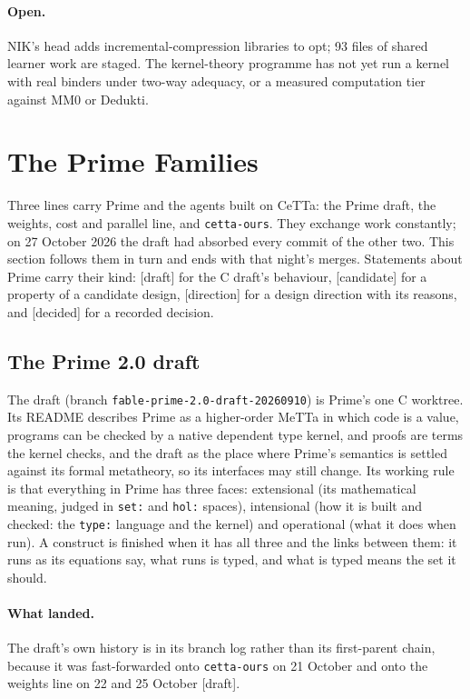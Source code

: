 \documentclass[11pt]{article}
\newcommand{\code}[1]{\texttt{#1}}
\newcommand{\kind}[1]{\textsf{\small[#1]}}
\newcommand{\CeTTa}{\textup{CeTTa}}
\begin{document}
\paragraph{Open.}  NIK's head adds incremental-compression libraries to opt;
93 files of shared learner work are staged.  The kernel-theory programme has
not yet run a kernel with real binders under two-way adequacy, or a measured
computation tier against MM0 or Dedukti.

\section{The Prime Families}
\label{sec:prime-families}

Three lines carry Prime and the agents built on \CeTTa{}: the Prime draft,
the weights, cost and parallel line, and \code{cetta-ours}.  They exchange
work constantly; on 27 October 2026 the draft had absorbed every commit of
the other two.  This section follows them in turn and ends with that night's
merges.  Statements about Prime carry their kind: \kind{draft} for the C
draft's behaviour, \kind{candidate} for a property of a candidate design,
\kind{direction} for a design direction with its reasons, and \kind{decided}
for a recorded decision.

\subsection{The Prime 2.0 draft}
\label{sec:line-draft}

The draft (branch \code{fable-prime-2.0-draft-20260910}) is Prime's one C
worktree.  Its README describes Prime as a higher-order MeTTa in which code is
a value, programs can be checked by a native dependent type kernel, and proofs
are terms the kernel checks, and the draft as the place where Prime's
semantics is settled against its formal metatheory, so its interfaces may
still change.  Its working rule is that everything in Prime has three faces:
extensional (its mathematical meaning, judged in \code{set:} and \code{hol:}
spaces), intensional (how it is built and checked: the \code{type:} language
and the kernel) and operational (what it does when run).  A construct is
finished when it has all three and the links between them: it runs as its
equations say, what runs is typed, and what is typed means the set it should.

\paragraph{What landed.}  The draft's own history is in its branch log rather
than its first-parent chain, because it was fast-forwarded onto
\code{cetta-ours} on 21 October and onto the weights line on 22 and
25 October \kind{draft}.
\end{document}
